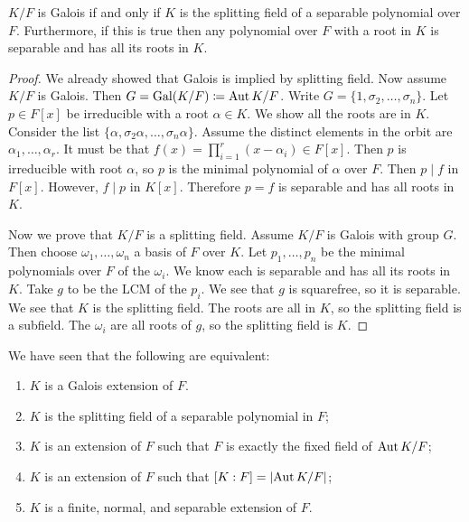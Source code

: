 \message{ !name(notes.tex)}\documentclass[10pt, twoside]{article}
\begin{document}
    \begin{thm}
        $K/F$ is Galois if and only if $K$ is the splitting field of a separable polynomial over $F$. Furthermore, if this is true then any polynomial over $F$ with a root in $K$ is separable and has all its roots in $K$.
        \begin{proof}
            We already showed that Galois is implied by splitting field. Now assume $K/F$ is Galois. Then $G = \mathrm{Gal}(K/F) \coloneqq \operatorname{Aut}{K/F}$. Write $G = \{1, \sigma_2, \ldots, \sigma_n\}$. Let $p \in F[x]$ be irreducible with a root $\alpha \in K$. We show all the roots are in $K$. Consider the list $\{\alpha, \sigma_2 \alpha, \ldots, \sigma_n \alpha\}$. Assume the distinct elements in the orbit are $\alpha_1, \ldots, \alpha_r$. It must be that $f(x) = \prod_{i=1}^r (x-\alpha_i) \in F[x]$. Then $p$ is irreducible with root $\alpha$, so $p$ is the minimal polynomial of $\alpha$ over $F$. Then $p \mid f$ in $F[x]$. However, $f \mid p$ in $K[x]$. Therefore $p = f$ is separable and has all roots in $K$.

            Now we prove that $K/F$ is a splitting field. Assume $K/F$ is Galois with group $G$. Then choose $\omega_1, \ldots, \omega_n$ a basis of $F$ over $K$. Let $p_1, \ldots, p_n$ be the minimal polynomials over $F$ of the $\omega_i$. We know each is separable and has all its roots in $K$. Take $g$ to be the $\mathrm{LCM}$ of the $p_i$. We see that $g$ is squarefree, so it is separable. We see that $K$ is the splitting field. The roots are all in $K$, so the splitting field is a subfield. The $\omega_i$ are all roots of $g$, so the splitting field is $K$.
        \end{proof}
    \end{thm}

    We have seen that the following are equivalent:
    \begin{enumerate}
        \item $K$ is a Galois extension of $F$.
        \item $K$ is the splitting field of a separable polynomial in $F$;
        \item $K$ is an extension of $F$ such that $F$ is exactly the fixed field of $\operatorname{Aut}{K/F}$;
        \item $K$ is an extension of $F$ such that $[K:F] = \lvert\operatorname{Aut}{K/F}\rvert$;
        \item $K$ is a finite, normal, and separable extension of $F$.
    \end{enumerate}
\end{document}
